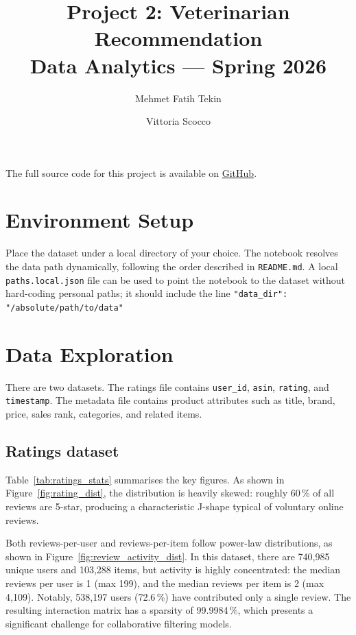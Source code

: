\documentclass[11pt,a4paper]{article}
\title{\textbf{Project 2: Veterinarian Recommendation}\\[0.4em]
\large Data Analytics --- Spring 2026}
\author{Mehmet Fatih Tekin \and Vittoria Scocco}
\begin{document}
\setlength{\droptitle}{-2cm}
\maketitle
\noindent The full source code for this project is available on \href{https://github.com/Vitto28/Vet_Recc}{GitHub}.
 
\section{Environment Setup}
\label{sec:setup}
 
Place the dataset under a local directory of your choice. The notebook resolves the data path dynamically, following the order described in \texttt{README.md}. A local \texttt{paths.local.json} file can be used to point the notebook to the dataset without hard-coding personal paths; it should include the line \texttt{"data\_dir": "/absolute/path/to/data"}
 
\section{Data Exploration}
\label{sec:exploration}
 
There are two datasets. The ratings file contains \texttt{user\_id}, \texttt{asin}, \texttt{rating}, and \texttt{timestamp}. The metadata file contains product attributes such as title, brand, price, sales rank, categories, and related items.
 
\subsection{Ratings dataset}
 
Table~\ref{tab:ratings_stats} summarises the key figures. As shown in Figure~\ref{fig:rating_dist}, the distribution is heavily skewed: roughly 60\,\% of all reviews are 5-star, producing a characteristic J-shape typical of voluntary online reviews.
 
Both reviews-per-user and reviews-per-item follow power-law distributions, as shown in Figure~\ref{fig:review_activity_dist}. In this dataset, there are 740,985 unique users and 103,288 items, but activity is highly concentrated: the median reviews per user is 1 (max 199), and the median reviews per item is 2 (max 4,109). Notably, 538,197 users (72.6\,\%) have contributed only a single review. The resulting interaction matrix has a sparsity of 99.9984\,\%, which presents a significant challenge for collaborative filtering models.
 
\end{document}
